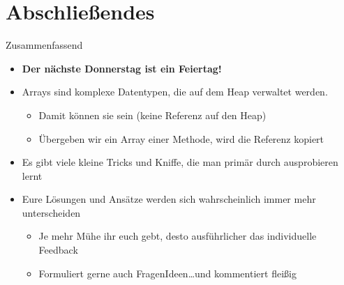 \section{Abschließendes}
{\SummaryFrame
\begin{frame}[t]{Zusammenfassend}
\pause \printBibCommand
\vfill\vfill %
\begin{itemize}[<+(1)->]
    \itemsep6.5pt
    \iffull\item \textbf{Der nächste Donnerstag ist ein Feiertag!}\fi
    \item Arrays sind komplexe Datentypen, die auf dem Heap verwaltet werden. \begin{itemize}
        \item Damit können sie  sein (keine Referenz auf den Heap)
        \item Übergeben wir ein Array einer Methode, wird die Referenz  kopiert 
    \end{itemize}
    \item Es gibt viele kleine Tricks und Kniffe, die man primär durch  ausprobieren lernt
    \item Eure Lösungen und Ansätze werden sich wahrscheinlich immer mehr unterscheiden\begin{itemize}
        \item Je mehr Mühe ihr euch gebt, desto ausführlicher das individuelle Feedback
        \item Formuliert gerne auch Fragen\textor Ideen\textor \ldots\quad und kommentiert fleißig
    \end{itemize}
\end{itemize}
\end{frame}
}



\iffull\fi

